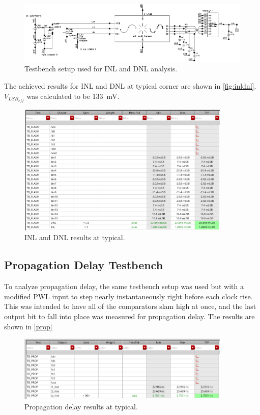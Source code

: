 \documentclass[11pt,letterpaper]{article}
\begin{document}
\begin{figure}[!t]
    \centering
    \includegraphics[width=6in]{flash_tb_old.eps}
    \caption{Testbench setup used for INL and DNL analysis.}
    \label{fig:tb-sch}
\end{figure}

The achieved results for INL and DNL at typical corner are shown in \cref{fig:inldnl}. \(V_{LSB_{eff}}\) was calculated to be \qty{133}{\mV}.

\begin{figure}[htbp!]
    \centering
    \includegraphics[width=4in]{INL_DNL_TYP_old.png}
    \caption{INL and DNL results at typical.}
    \label{fig:prop-plot}
\end{figure}

\subsection{Propagation Delay Testbench}

To analyze propagation delay, the same testbench setup was used but with a modified PWL input to step nearly instantaneously right before each clock rise. This was intended to have all of the comparators slam high at once, and the last output bit to fall into place was measured for propagation delay. The results are shown in \cref{prop}

\begin{figure}[htbp!]
    \centering
    \includegraphics[width=4in]{TP_TYP_old.png}
    \caption{Propagation delay results at typical.}
    \label{fig:prop}
\end{figure}
\end{document}

